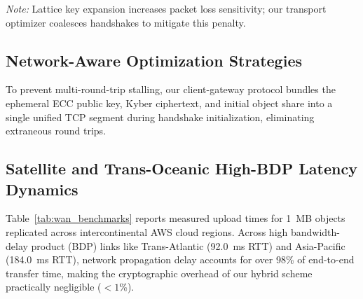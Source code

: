 \documentclass[sn-mathphys,Numbered]{sn-jnl}%
\theoremstyle{thmstyleone}%
\theoremstyle{thmstyletwo}%
\theoremstyle{thmstylethree}%
\begin{document}
\begin{table}[!htbp]
\centering
\caption{Handshake latency and TCP segment retransmission under synthetic packet loss.}
\label{tab:network_benchmarks}
\vspace{0.3em}
\raggedright\small\textit{Note:} Lattice key expansion increases packet loss sensitivity; our transport optimizer coalesces handshakes to mitigate this penalty.
\end{table}

\subsection{\textbf{Network-Aware Optimization Strategies}}
To prevent multi-round-trip stalling, our client-gateway protocol bundles the ephemeral ECC public key, Kyber ciphertext, and initial object share into a single unified TCP segment during handshake initialization, eliminating extraneous round trips.

\subsection{\textbf{Satellite and Trans-Oceanic High-BDP Latency Dynamics}}
Table~\ref{tab:wan_benchmarks} reports measured upload times for 1~MB objects replicated across intercontinental AWS cloud regions. Across high bandwidth-delay product (BDP) links like Trans-Atlantic (92.0~ms RTT) and Asia-Pacific (184.0~ms RTT), network propagation delay accounts for over 98\% of end-to-end transfer time, making the cryptographic overhead of our hybrid scheme practically negligible ($<1$\%).
\end{document}
